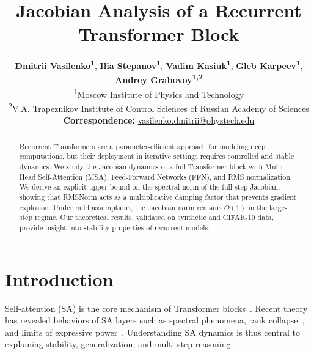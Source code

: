 \documentclass{zapiski}
\date{}
\theoremstyle{plain}
\theoremstyle{definition}
\theoremstyle{remark}
\begin{document}
\title[Jacobian Analysis of Transformers]{Jacobian Analysis of a Recurrent Transformer Block}

\author{
  \textbf{Dmitrii Vasilenko\textsuperscript{1}},
  \textbf{Ilia Stepanov\textsuperscript{1}},
  \textbf{Vadim Kasiuk\textsuperscript{1}},
  \textbf{Gleb Karpeev\textsuperscript{1}},
  \textbf{Andrey Grabovoy\textsuperscript{1,2}}
\\ \vspace{0.2cm}
  \textsuperscript{1}Moscow Institute of Physics and Technology\\
  \textsuperscript{2}V.A. Trapeznikov Institute of Control Sciences of Russian Academy of Sciences
\\ \vspace{0.2cm}
  {\small \textbf{Correspondence:} \href{mailto:vasilenko.dmitrii@phystech.edu}{vasilenko.dmitrii@phystech.edu}}
}

\begin{abstract}
Recurrent Transformers are a parameter-efficient approach for modeling deep computations, but their deployment in iterative settings requires controlled and stable dynamics. We study the Jacobian dynamics of a full Transformer block with Multi-Head Self-Attention (MSA), Feed-Forward Networks (FFN), and RMS normalization. We derive an explicit upper bound on the spectral norm of the full-step Jacobian, showing that RMSNorm acts as a multiplicative damping factor that prevents gradient explosion. Under mild assumptions, the Jacobian norm remains $O(1)$ in the large-step regime. Our theoretical results, validated on synthetic and CIFAR-10 data, provide insight into stability properties of recurrent models.
\end{abstract}


\maketitle


\section{Introduction}

Self-attention (SA) is the core mechanism of Transformer blocks~\cite{DBLP:journals/corr/VaswaniSPUJGKP17}. Recent theory has revealed behaviors of SA layers such as spectral phenomena, rank collapse~\cite{noci2022signalpropagationtransformerstheoretical}, and limits of expressive power~\cite{yun2019transformers,kajitsuka2023transformers,nichani2024understanding}. Understanding SA dynamics is thus central to explaining stability, generalization, and multi-step reasoning.
\end{document}
